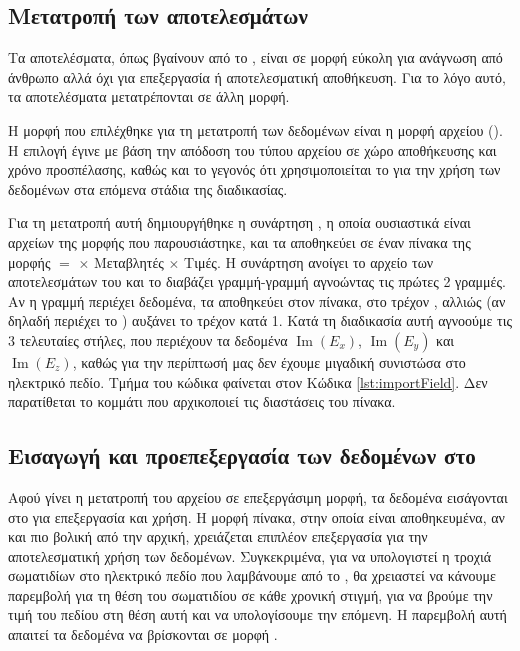 \subsection{Μετατροπή των αποτελεσμάτων}

Τα αποτελέσματα, όπως βγαίνουν από το , είναι σε μορφή εύκολη για ανάγνωση από άνθρωπο αλλά όχι για επεξεργασία ή αποτελεσματική αποθήκευση. 
Για το λόγο αυτό, τα αποτελέσματα μετατρέπονται σε άλλη μορφή. 

Η μορφή που επιλέχθηκε για τη μετατροπή των δεδομένων είναι η μορφή αρχείου  ().
Η επιλογή έγινε με βάση την απόδοση του τύπου αρχείου σε χώρο αποθήκευσης και χρόνο προσπέλασης, καθώς και το γεγονός ότι χρησιμοποιείται το  για την χρήση των δεδομένων στα επόμενα στάδια της διαδικασίας.

Για τη μετατροπή αυτή δημιουργήθηκε η συνάρτηση , η οποία ουσιαστικά είναι  αρχείων της μορφής που παρουσιάστηκε, και τα αποθηκεύει σε έναν πίνακα της μορφής  $=$  $\times$ Μεταβλητές $\times$ Τιμές.
Η συνάρτηση ανοίγει το αρχείο των αποτελεσμάτων του  και το διαβάζει γραμμή-γραμμή αγνοώντας τις πρώτες 2 γραμμές. 
Αν η γραμμή περιέχει δεδομένα, τα αποθηκεύει στον πίνακα, στο τρέχον , αλλιώς (αν δηλαδή περιέχει το  ) αυξάνει το τρέχον  κατά 1. 
Κατά τη διαδικασία αυτή αγνοούμε τις 3 τελευταίες στήλες, που περιέχουν τα δεδομένα $\operatorname{Im}(E_x)$, $\operatorname{Im}(E_y)$ και $\operatorname{Im}(E_z)$, καθώς για την περίπτωσή μας δεν έχουμε μιγαδική συνιστώσα στο ηλεκτρικό πεδίο.
Τμήμα του κώδικα φαίνεται στον Κώδικα \ref{lst:importField}. 
Δεν παρατίθεται το κομμάτι που αρχικοποιεί τις διαστάσεις του πίνακα.



\subsection{Εισαγωγή και προεπεξεργασία των δεδομένων στο }

Αφού γίνει η μετατροπή του αρχείου σε επεξεργάσιμη μορφή, τα δεδομένα εισάγονται στο  για επεξεργασία και χρήση.
Η μορφή πίνακα, στην οποία είναι αποθηκευμένα, αν και πιο βολική από την αρχική, χρειάζεται επιπλέον επεξεργασία για την αποτελεσματική χρήση των δεδομένων.
Συγκεκριμένα, για να υπολογιστεί η τροχιά σωματιδίων στο ηλεκτρικό πεδίο που λαμβάνουμε από το , θα χρειαστεί να κάνουμε παρεμβολή για τη θέση του σωματιδίου σε κάθε χρονική στιγμή, για να βρούμε την τιμή του πεδίου στη θέση αυτή και να υπολογίσουμε την επόμενη. 
Η παρεμβολή αυτή απαιτεί τα δεδομένα να βρίσκονται σε μορφή .

